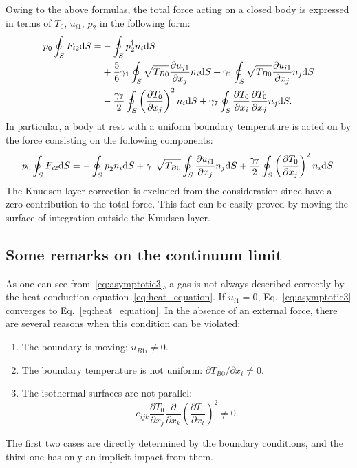 \documentclass[smallextended, referee]{svjour3} %
\newcommand{\dd}{\mathrm{d}}
\newcommand{\pder}[2][]{\frac{\partial#1}{\partial#2}}
\newcommand{\Pder}[2][]{\partial#1/\partial#2}
\begin{document}
Owing to the above formulas, the total force acting on a closed body
is expressed in terms of \(T_0\), \(u_{i1}\), \(p^\dag_2\) in the following form:
\begin{align}\label{eq:force:terms_general}
    p_0 \oint_S F_{i2} \dd{S} =
        &- \oint_S p_2^\dag n_i \dd{S} \notag\\
        &+ \frac{5}{6}\gamma_1 \oint_S \sqrt{T_{B0}} \pder[u_{j1}]{x_j} n_i \dd{S}
        + \gamma_1 \oint_S \sqrt{T_{B0}} \pder[u_{i1}]{x_j} n_j \dd{S} \notag\\
        &- \frac{\gamma_7}{2} \oint_S \left(\pder[T_0]{x_j}\right)^2 n_i \dd{S}
        + \gamma_7 \oint_S \pder[T_0]{x_i}\pder[T_0]{x_j} n_j \dd{S}.
\end{align}
In particular, a body at rest with a uniform boundary temperature is acted on by the force consisting on
the following components:
\begin{equation}\label{eq:force:terms}
    p_0 \oint_S F_{i2} \dd{S} =
        - \oint_S p_2^\dag n_i \dd{S} \\
        + \gamma_1 \sqrt{T_{B0}} \oint_S \pder[u_{i1}]{x_j} n_j \dd{S}
        + \frac{\gamma_7}{2} \oint_S \left(\pder[T_0]{x_j}\right)^2 n_i \dd{S}.
\end{equation}
The Knudsen-layer correction is excluded from the consideration since have a zero contribution to the total force.
This fact can be easily proved by moving the surface of integration outside the Knudsen layer.

\subsection{Some remarks on the continuum limit}

As one can see from~\eqref{eq:asymptotic3}, a gas is not always described correctly
by the heat-conduction equation~\eqref{eq:heat_equation}.
If \(u_{i1} = 0\), Eq.~\eqref{eq:asymptotic3} converges to Eq.~\eqref{eq:heat_equation}.
In the absence of an external force, there are several reasons when this condition can be violated:
\begin{enumerate}
    \item The boundary is moving: \(u_{B1i} \neq 0 \).
    \item The boundary temperature is not uniform: \(\Pder[T_{B0}]{x_i} \neq 0 \).
    \item The isothermal surfaces are not parallel:
        \begin{equation}\label{eq:equilibrium}
            e_{ijk}\pder[T_0]{x_j}\pder{x_k}\left(\pder[T_0]{x_l}\right)^2 \neq 0.
        \end{equation}
\end{enumerate}
The first two cases are directly determined by the boundary conditions,
and the third one has only an implicit impact from them.
\end{document}
